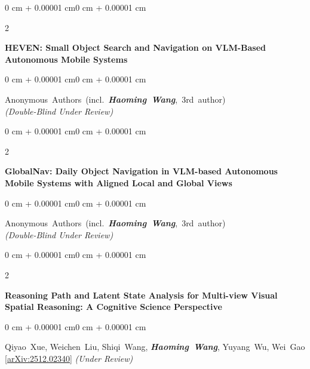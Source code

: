 \documentclass[10pt, letterpaper]{article}
\newenvironment{onecolentry}{
    \begin{adjustwidth}{0 cm + 0.00001 cm}{0 cm + 0.00001 cm}
}{
    \end{adjustwidth}
}
\newenvironment{twocolentry}[2][]{
    \onecolentry
    \def\secondColumn{#2}
    \setcolumnwidth{\fill, 4.5 cm}
    \begin{paracol}{2}
}{
    \switchcolumn \raggedleft \secondColumn
    \end{paracol}
    \endonecolentry
}
\let\hrefWithoutArrow\href
\begin{document}
\begin{samepage}
            \vspace{0.3 cm}

            \begin{twocolentry}{
                2026
            }
                \textbf{HEVEN: Small Object Search and Navigation on VLM-Based Autonomous Mobile Systems}
            \end{twocolentry}
            \vspace{0.10 cm}
            \begin{onecolentry}
                \mbox{Anonymous Authors (incl.\ \textbf{\textit{Haoming Wang}}, 3rd author)}
                \vspace{0.10 cm}
                \\ \textit{(Double-Blind Under Review)}
            \end{onecolentry}

            \vspace{0.3 cm}

            \begin{twocolentry}{
                2026
            }
                \textbf{GlobalNav: Daily Object Navigation in VLM-based Autonomous Mobile Systems with Aligned Local and Global Views}
            \end{twocolentry}
            \vspace{0.10 cm}
            \begin{onecolentry}
                \mbox{Anonymous Authors (incl.\ \textbf{\textit{Haoming Wang}}, 3rd author)}
                \vspace{0.10 cm}
                \\ \textit{(Double-Blind Under Review)}
            \end{onecolentry}

            \vspace{0.3 cm}

            \begin{twocolentry}{
                2026
            }
                \textbf{Reasoning Path and Latent State Analysis for Multi-view Visual Spatial Reasoning: A Cognitive Science Perspective}
            \end{twocolentry}
            \vspace{0.10 cm}
            \begin{onecolentry}
                \mbox{Qiyao Xue}, \mbox{Weichen Liu}, \mbox{Shiqi Wang}, \mbox{\textbf{\textit{Haoming Wang}}}, \mbox{Yuyang Wu}, \mbox{Wei Gao}
                \vspace{0.10 cm}
                \\ \hrefWithoutArrow{https://arxiv.org/abs/2512.02340}{[arXiv:2512.02340]} \textit{(Under Review)}
            \end{onecolentry}


\end{samepage}
\end{document}
